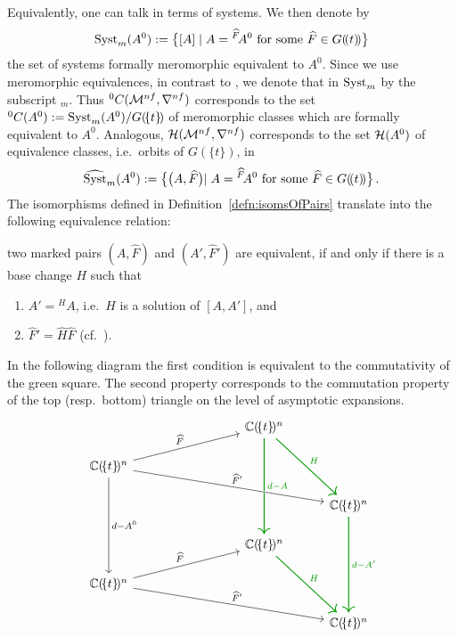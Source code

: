Equivalently, one can talk in terms of systems. We then denote by
\[
  \operatorname{Syst}_m(A^0):=\bigl\{[A]
    \mid A={}^{\widehat F}\!A^0 \text{ for some } \widehat F\in G(\!(t)\!)\bigr\}
\]
the set of systems formally meromorphic equivalent to $A^0$.
Since we use meromorphic equivalences, in contrast to \cite{boalch,thboalch},
we denote that in $\operatorname{Syst}_m$ by the subscript ${}_m$.
Thus ${}^0C(\mathcal{M}^{nf},\nabla^{nf})$ corresponds to
the set ${}^0C(A^0):=\operatorname{Syst}_m(A^0)/G(\!\{t\}\!)$ of meromorphic classes which
are formally equivalent to $A^0$.
Analogous, $\mathcal{H}(\mathcal{M}^{nf},\nabla^{nf})$ corresponds to the set $\mathcal{H}(A^0)$ of
equivalence classes, i.e.\ orbits of $G(\!\{t\}\!)$, in
\label{page:ofDefnOfIsomOfMarkedPairs}
\[
  \widehat{\operatorname{Syst}}_m(A^0):=\bigl\{\bigl(A,\widehat F\bigl)
    \mid A={}^{\widehat F}\!A^0 \text{ for some } \widehat F\in G(\!(t)\!)\bigl\} \,.
\]
The isomorphisms defined in Definition~\ref{defn:isomsOfPairs} translate into
the following equivalence relation:
\begin{einr}
  two marked pairs $(A,\hat F)$ and $(A',\hat F')$ are equivalent, if and only
  if there is a base change $H$ such that
  \begin{enumerate}
  \item $A'={}^{H}\!A$, i.e.\ $H$ is a solution of $[A,A']$, and
  \item $\hat F'=\hat H\hat F$ (cf.\ \cite[71]{babbitt1989local}).
  \end{enumerate}
\end{einr}
In the following diagram the first condition is equivalent to the commutativity
of the \textcolor{green!60!black}{green} square. The second property corresponds
to the commutation property of the top (resp.\ bottom) triangle on the level of
asymptotic expansions.
\[ \begin{tikzcd}[column sep=1cm,row sep=.5cm]
  &&&\C(\!\{t\}\!)^n \arrow[green!60!black, thick]{ddd}{d-A}
    \arrow[green!60!black, thick]{ddr}{H}
\\\C(\!\{t\}\!)^n \arrow{rrru}{\hat F}
  \arrow[ultra thick, white]{rrrrd}{\hat F'}
  \arrow{rrrrd}{\hat F'}
  \arrow{ddd}{d-A^0}
\\&&&&\C(\!\{t\}\!)^n \arrow[green!60!black, thick]{ddd}{d-A'}
\\&&&\C(\!\{t\}\!)^n \arrow[green!60!black, thick]{ddr}{H}
\\\C(\!\{t\}\!)^n \arrow{rrru}{\hat F} \arrow{rrrrd}{\hat F'}
\\&&&&\C(\!\{t\}\!)^n
\end{tikzcd} \]

